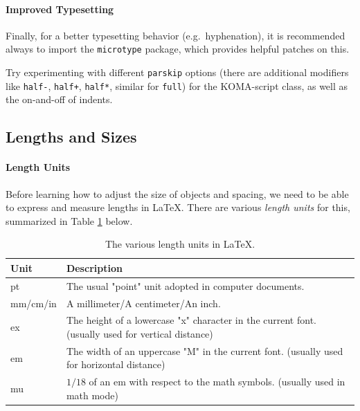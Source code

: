 \paragraph{Improved Typesetting}
Finally, for a better typesetting behavior (e.g.\ hyphenation), it is recommended always to import the \verb|microtype| package, which provides helpful patches on this.

\begin{exercisebox}
\begin{Exercise}
Try experimenting with different \verb|parskip| options (there are additional modifiers like \verb|half-|, \verb|half+|, \verb|half*|, similar for \verb|full|) for the KOMA-script class, as well as the on-and-off of indents.     
\end{Exercise}
\end{exercisebox}

\subsection{Lengths and Sizes}

\paragraph{Length Units}
Before learning how to adjust the size of objects and spacing, we need to be able to express and measure lengths in \LaTeX{}. There are various \textit{length units} for this, summarized in Table \ref{tab:lengthunit} below.

\begin{table}[ht!]
\begin{tabularx}{\textwidth}{|l|X|}
\hline
Unit & Description \\
\hline
pt & The usual "point" unit adopted in computer documents. \\
\hline
mm/cm/in & A millimeter/A centimeter/An inch. \\
\hline
ex & The height of a lowercase "x" character in the current font. (usually used for vertical distance) \\
\hline
em & The width of an uppercase "M" in the current font. (usually used for horizontal distance) \\
\hline
mu & $1/18$ of an em with respect to the math symbols. (usually used in math mode) \\
\hline
\end{tabularx}
\caption{The various length units in \LaTeX{}.}
\label{tab:lengthunit}
\end{table}

